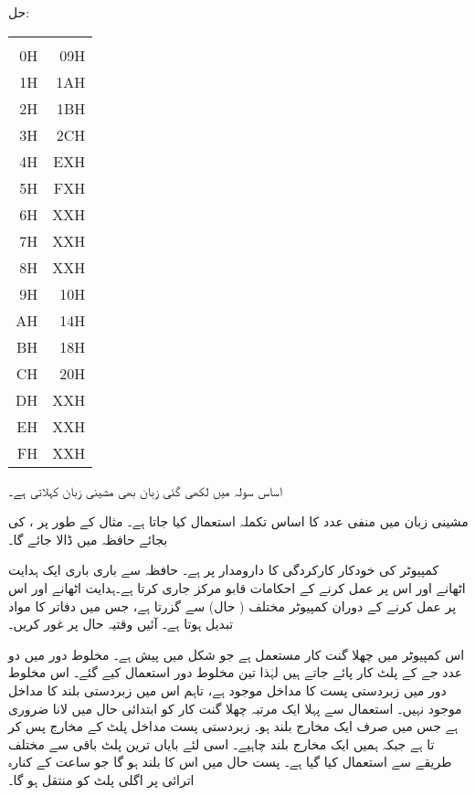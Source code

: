 حل:\quad
\begin{center}
\begin{tabular}{RR}
& \\[0.5ex]
0H&09H \\
1H&1AH\\
2H&1BH\\
3H&2CH\\
4H&EXH\\
5H&FXH\\
6H&XXH\\
7H&XXH\\
8H&XXH\\
9H&10H\\
AH&14H\\
BH&18H\\
CH&20H\\
DH&XXH\\
EH&XXH\\
FH&XXH
\end{tabular}
\end{center}
اساس سولہ میں لکھی گئی زبان بھی مشینی زبان کہلاتی ہے۔

  مشینی زبان میں منفی عدد کا اساس  تکملہ  استعمال کیا جاتا ہے۔ مثال کے طور پر ،   کی بجائے  حافظہ میں ڈالا جائے گا۔

کمپیوٹر کی خودکار کارکردگی کا دارومدار  پر ہے۔ حافظہ سے باری باری ایک  ہدایت    اٹھانے اور اس پر عمل کرنے  کے  احکامات قابو مرکز جاری کرتا ہے۔ہدایت  اٹھانے اور اس پر عمل کرنے کے دوران کمپیوٹر مختلف  ( حال)   سے گزرتا ہے، جس میں دفاتر  کا  مواد  تبدیل ہوتا ہے۔ آئیں وقتیہ حال پر غور کریں۔

اس کمپیوٹر میں  چھلا گنت کار  مستعمل ہے جو شکل  میں پیش ہے۔ مخلوط دور  میں دو عدد جے کے پلٹ کار  پائے جاتے ہیں لہٰذا تین مخلوط دور استعمال کیے گئے۔ اس  مخلوط دور میں زبردستی پست   کا مداخل موجود ہے، تاہم اس میں زبردستی بلند کا مداخل موجود نہیں۔  استعمال سے پہلا ایک مرتبہ  چھلا گنت کار کو ابتدائی حال میں لانا ضروری ہے جس میں صرف ایک مخارج بلند ہو۔  زبردستی پست مداخل پلٹ کے   مخارج پس کر تا ہے جبکہ ہمیں ایک مخارج بلند چاہیے۔ اسی لئے  بایاں ترین پلٹ باقی سے مختلف طریقے سے استعمال کیا گیا ہے۔ پست حال میں اس کا  بلند ہو گا جو ساعت کے کنارہ اترائی پر اگلی پلٹ کو منتقل ہو گا۔

